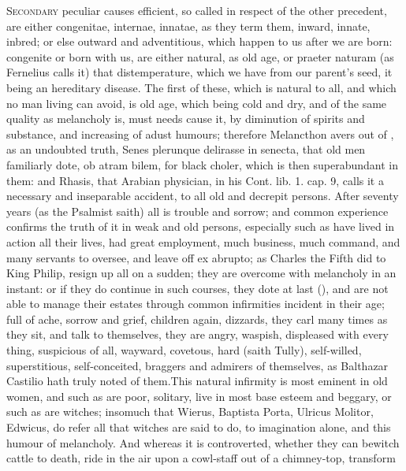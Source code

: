 {{\lettrine{S}{econdary} peculiar causes efficient, so called in respect of the other
precedent, are either congenitae, internae, innatae, as they term them,
inward, innate, inbred; or else outward and adventitious, which happen
to us after we are born: congenite or born with us, are either natural,
as old age, or praeter naturam (as Fernelius calls it) that
distemperature, which we have from our parent's seed, it being an
hereditary disease. The first of these, which is natural to all, and
which no man living can avoid, is old age, which being cold and
dry, and of the same quality as melancholy is, must needs cause it, by
diminution of spirits and substance, and increasing of adust humours;
therefore  Melancthon avers out of \Aristotle, as an undoubted
truth, Senes plerunque delirasse in senecta, that old men familiarly
dote, ob atram bilem, for black choler, which is then superabundant in
them: and Rhasis, that Arabian physician, in his Cont. lib. 1. cap. 9,
calls it a necessary and inseparable accident, to all old and
decrepit persons. After seventy years (as the Psalmist saith) all
is trouble and sorrow; and common experience confirms the truth of it
in weak and old persons, especially such as have lived in action all
their lives, had great employment, much business, much command, and
many servants to oversee, and leave off ex abrupto; as Charles
the Fifth did to King Philip, resign up all on a sudden; they are
overcome with melancholy in an instant: or if they do continue in such
courses, they dote at last (), and are not able to
manage their estates through common infirmities incident in their age;
full of ache, sorrow and grief, children again, dizzards, they carl
many times as they sit, and talk to themselves, they are angry,
waspish, displeased with every thing, suspicious of all, wayward,
covetous, hard (saith Tully), self-willed, superstitious,
self-conceited, braggers and admirers of themselves, as Balthazar
Castilio hath truly noted of them.This natural infirmity is most
eminent in old women, and such as are poor, solitary, live in most base
esteem and beggary, or such as are witches; insomuch that Wierus,
Baptista Porta, Ulricus Molitor, Edwicus, do refer all that witches are
said to do, to imagination alone, and this humour of melancholy. And
whereas it is controverted, whether they can bewitch cattle to death,
ride in the air upon a cowl-staff out of a chimney-top, transform
}}
